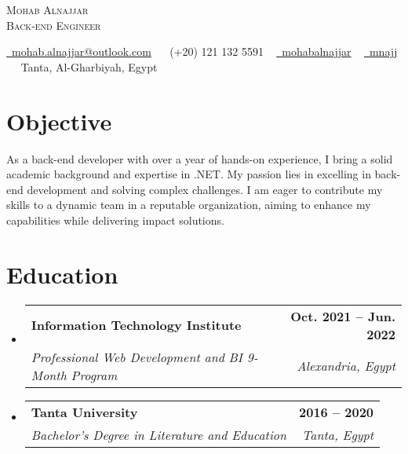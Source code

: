 \documentclass[letterpaper,11pt]{article}
\makeatletter
\newcommand{\resumeSubheading}[4]{
  \vspace{-2pt}\item
    \begin{tabular*}{1.0\textwidth}[t]{l@{\extracolsep{\fill}}r}
      \textbf{#1} & \textbf{\small #2} \\
      \textit{\small#3} & \textit{\small #4} \\
    \end{tabular*}\vspace{-7pt}
}
\newcommand{\resumeSubHeadingListStart}{\begin{itemize}[leftmargin=0.0in, label={}]}
\newcommand{\resumeSubHeadingListEnd}{\end{itemize}}
\makeatother
\begin{document}

\begin{center}
    {\Huge \scshape Mohab Alnajjar} \\ \vspace{5pt}
    {\Large \scshape Back-end Engineer} \\ \vspace{10pt}

    \href{mailto:mohab.alnajjar@outlook.com}{\raisebox{-0.2\height}\faEnvelope\  {mohab.alnajjar@outlook.com}} ~  
    \small \raisebox{-0.1\height}\faPhone\ (+20) 121 132 5591 ~ 
\href{https://linkedin.com/in/mohabalnajjar }{\raisebox{-0.2\height}\faLinkedin\ mohabalnajjar} ~
    \href{https://github.com/mnajj}{\raisebox{-0.2\height}\faGithub\ mnajj} ~
    \faMapMarker\ Tanta, Al-Gharbiyah, Egypt \hspace{1pt}
\end{center}

\section{Objective}
As a back-end developer with over a year of hands-on experience, I bring a solid academic background and expertise in .NET. My passion lies in excelling in back-end development and solving complex challenges. I am eager to contribute my skills to a dynamic team in a reputable organization, aiming to enhance my capabilities while delivering impact solutions.
\vspace{-7pt}
\section{Education}
  \resumeSubHeadingListStart
    \resumeSubheading
      {Information Technology Institute}{Oct. 2021 – Jun. 2022}
      {Professional Web Development and BI 9-Month Program}{Alexandria, Egypt}
         \resumeSubheading
      {Tanta University}{2016 – 2020}
      {Bachelor's Degree in Literature and Education}{Tanta, Egypt}
  \resumeSubHeadingListEnd
\end{document}
